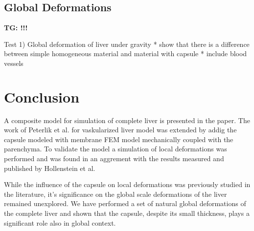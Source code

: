 \documentclass{llncs}
\newcommand{\TG}[1]{{\color{blue}\textbf{TG: #1}}}
\begin{document}


\subsection{Global Deformations}

\TG{!!!}

Test 1) Global deformation of liver under gravity
  * show that there is a difference between simple homogeneous material
    and material with capsule
  * include blood vessels


\section{Conclusion} %

A composite model for simulation of complete liver is presented in the
paper. The work of Peterlik et al. for vaskularized liver model was
extended by addig the capsule modeled with membrane FEM model mechanically
coupled with the parenchyma. To validate the model a simulation of local
deformations was performed and was found in an aggrement with the results
measured and published by Hollenstein et al.

While the influence of the capsule on local deformations was previously
studied in the literature, it's significance on the global scale
deformations of the liver remained unexplored. We have performed a set of
natural global deformations of the complete liver and shown that the
capsule, despite its small thickness, plays a significant role also in
global context.


%
%



\end{document}

